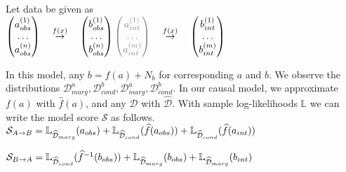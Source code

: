 \documentclass{article}
\begin{document}
Let data be given as \\
\begin{math}
    \begin{pmatrix} 
        a_{obs}^{(1)}\\
        \dots\\
        a_{obs}^{(n)}\\
    \end{pmatrix}
    \quad\overset{f(x)}{\to}\quad
    \begin{pmatrix} 
        b_{obs}^{(1)}\\
        \dots\\
        b_{obs}^{(n)}\\
    \end{pmatrix}
    \\
    \textcolor{gray}{
        \begin{pmatrix} 
            a_{int}^{(1)}\\
            \dots\\
            a_{int}^{(m)}\\
        \end{pmatrix}
    }
    \quad\overset{f(x)}{\to}\quad
    \begin{pmatrix} 
        b_{int}^{(1)}\\
        \dots\\
        b_{int}^{(m)}\\
    \end{pmatrix}\\
\end{math}

\noindent
In this model, any $b = f(a) + N_b$ for corresponding $a$ and $b$. We observe the distributions $\mathcal{D}_{marg}^{a}, \mathcal{D}_{cond}^{b}, \mathcal{D}_{marg}^{a}, \mathcal{D}_{cond}^{b}$. In our causal model, we approximate $f(a)$ with $\widehat{f}(a)$, and any $\mathcal{D}$ with $\widehat{\mathcal{D}}$. With sample log-likelihoods $\mathbb{L}$ we can write the model score $\mathcal{S}$ as follows.\\

\begin{math}
    \mathcal{S}_{A \to B} = \mathbb{L}_{\widehat{\mathcal{D}}_{marg}}(a_{obs}) + 
                  \mathbb{L}_{\widehat{\mathcal{D}}_{cond}}(\widehat{f}(a_{obs})) +
                  \mathbb{L}_{\widehat{\mathcal{D}}_{cond}}(\widehat{f}(a_{int}))\\
\end{math}

\begin{math}
    \mathcal{S}_{B \to A} = \mathbb{L}_{\widehat{\mathcal{D}}_{cond}}(\widehat{f}^{-1}(b_{obs})) + 
                  \mathbb{L}_{\widehat{\mathcal{D}}_{marg}}(b_{obs}) +
                  \mathbb{L}_{\widehat{\mathcal{D}}_{marg}}(b_{int})\\
\end{math}
\end{document}
